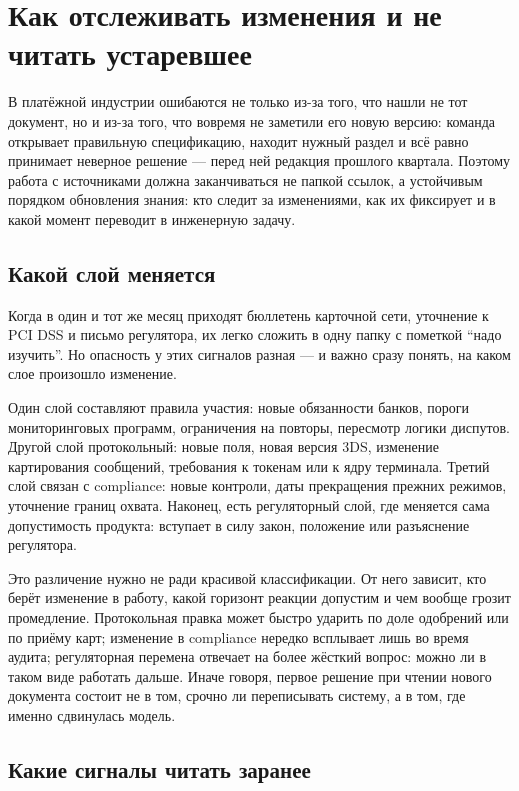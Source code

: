 \chapter{Как отслеживать изменения и не читать устаревшее}
\label{ch:change-tracking}
В платёжной индустрии ошибаются не только из-за того, что нашли
не тот документ, но и из-за того, что вовремя не заметили
его новую версию: команда открывает правильную спецификацию,
находит нужный раздел и всё равно принимает неверное решение ---
перед ней редакция прошлого квартала. Поэтому работа с источниками
должна заканчиваться не папкой ссылок, а устойчивым порядком
обновления знания: кто следит за изменениями, как их фиксирует
и в какой момент переводит в инженерную задачу.

\section{Какой слой меняется}
\label{sec:ps-tracking-layers}

Когда в один и тот же месяц приходят бюллетень карточной сети,
уточнение к PCI DSS и письмо регулятора, их легко сложить в одну
папку с пометкой \enquote{надо изучить}. Но опасность у этих сигналов
разная --- и важно сразу понять, на каком слое произошло изменение.

Один слой составляют правила участия: новые обязанности банков,
пороги мониторинговых программ, ограничения на повторы, пересмотр
логики диспутов. Другой слой протокольный: новые поля, новая
версия 3DS, изменение картирования сообщений, требования
к токенам или к ядру терминала. Третий слой связан с compliance:
новые контроли, даты прекращения прежних режимов, уточнение границ
охвата. Наконец, есть регуляторный слой, где меняется сама
допустимость продукта: вступает в силу закон, положение
или разъяснение регулятора.

Это различение нужно не ради красивой классификации. От него
зависит, кто берёт изменение в работу, какой горизонт реакции
допустим и чем вообще грозит промедление. Протокольная правка
может быстро ударить по доле одобрений или по приёму карт;
изменение в compliance нередко всплывает лишь во время аудита;
регуляторная перемена отвечает на более жёсткий вопрос:
можно ли в таком виде работать дальше. Иначе говоря, первое
решение при чтении нового документа состоит не в том, срочно ли
переписывать систему, а в том, где именно сдвинулась модель.

\section{Какие сигналы читать заранее}
\label{sec:ps-tracking-bulletins}

